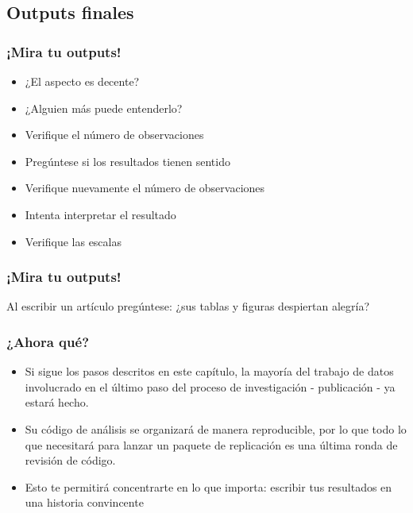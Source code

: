 \documentclass[10pt, aspectratio=169, compress]{beamer}
\makeatletter
\def\beamer@writeslidentry@miniframesoff{%
	\expandafter\beamer@ifempty\expandafter{\beamer@framestartpage}{}%
	{%
		\clearpage\beamer@notesactions%
	}
}
\newcommand*{\miniframesoff}{\let\beamer@writeslidentry=\beamer@writeslidentry@miniframesoff}
\makeatother
\begin{document}
\subsection{Outputs finales}
\begin{frame}[t]
	\frametitle{¡Mira tu outputs!}
	\begin{itemize}
		\item ¿El aspecto es decente?
		\item ¿Alguien más puede entenderlo?
		\item Verifique el número de observaciones
		\item Pregúntese si los resultados tienen sentido
		\item Verifique nuevamente el número de observaciones
		\item Intenta interpretar el resultado
		\item Verifique las escalas
	\end{itemize}
\end{frame}
\begin{frame}
	\frametitle{¡Mira tu outputs!}

	\begin{center}
		{
		\LARGE
			Al escribir un artículo pregúntese: ¿sus tablas y figuras despiertan alegría?
		}
	\end{center}
\end{frame}
\begin{frame}[t]
	\frametitle{¿Ahora qué?}

	\begin{itemize}[<+->]
		\item Si sigue los pasos descritos en este capítulo, la mayoría del trabajo de datos involucrado en el último paso del proceso de investigación - publicación - ya estará hecho.
		\item Su código de análisis se organizará de manera reproducible, por lo que todo lo que necesitará para lanzar un paquete de replicación es una última ronda de revisión de código.
		\item Esto te permitirá concentrarte en lo que importa: escribir tus resultados en una historia convincente
	\end{itemize}
\end{frame}

\miniframesoff 	
\end{document}
